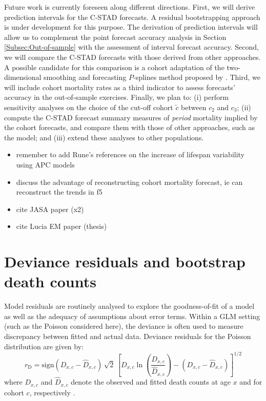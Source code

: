 \documentclass[11pt, a4paper]{article}
\begin{document}
Future work is currently foreseen along different directions. First, we will derive prediction intervals for the C-STAD forecasts. A residual bootstrapping approach is under development for this purpose. The derivation of prediction intervals will allow us to complement the point forecast accuracy analysis in Section \ref{Subsec:Out-of-sample} with the assessment of interval forecast accuracy. Second, we will compare the C-STAD forecasts with those derived from other approaches. A possible candidate for this comparison is a cohort adaptation of the two-dimensional smoothing and forecasting $P$-splines method proposed by \cite{currie2004smoothing}. Third, we will include cohort mortality rates as a third indicator to assess forecasts' accuracy in the out-of-sample exercises. Finally, we plan to: (i) perform sensitivity analyses on the choice of the cut-off cohort $\tilde{c}$ between $c_2$ and $c_3$; (ii) compute the C-STAD forecast summary measures of \textit{period} mortality implied by the cohort forecasts, and compare them with those of other approaches, such as the \cite{lee1992modeling} model; and (iii) extend these analyses to other populations.

\begin{itemize}
	\item remember to add Rune's references on the increase of lifespan variability using APC models
	\item discuss the advantage of reconstructing cohort mortality forecast, ie can reconstruct the trends in f5
	\item cite JASA paper (x2)
	\item cite Lucia EM paper (thesis)
\end{itemize}


\small
 

\appendix
{}
\normalsize

\section{Deviance residuals and bootstrap death counts}
\label{Appendix:ResidualDeath}     
Model residuals are routinely analysed to explore the goodness-of-fit of a model as well as the adequacy of assumptions about error terms. Within a GLM setting (such as the Poisson considered here), the deviance is often used to measure discrepancy between fitted and actual data. Deviance residuals for the Poisson distribution are given by: 
\begin{equation}\label{Eq:DevRes}
r_{\mathrm{D}}= \mathrm{sign} (D_{x,c}-\hat{D}_{x,c}) \, \sqrt{2} \, 
\left[D_{x,c} \ln \left(\frac{D_{x,c}}{\hat{D}_{x,c}}\right) - 
\left(D_{x,c}-\hat{D}_{x,c}\right)
\right]^{1/2}
\end{equation}
where $D_{x,c}$ and $\hat{D}_{x,c}$ denote the observed and fitted death counts at age $x$ and for cohort $c$, respectively \citep{mccullagh1989glm}. 
\end{document}
